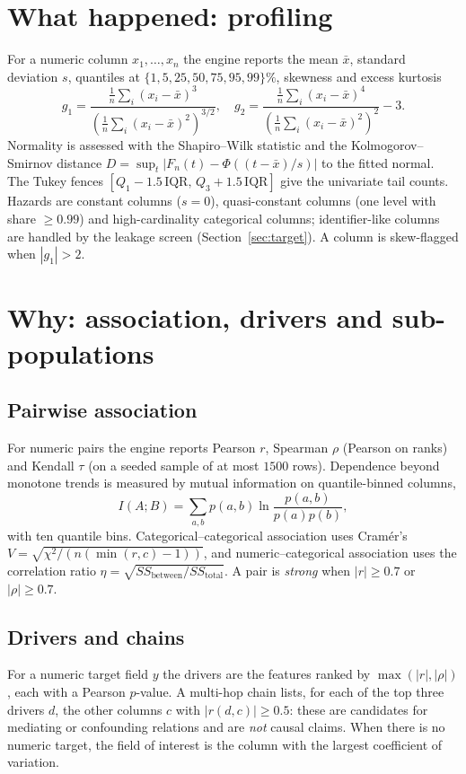 \documentclass[conference]{IEEEtran}
\begin{document}
\section{What happened: profiling}\label{sec:profile}
For a numeric column $x_1,\ldots,x_n$ the engine reports the mean $\bar x$, standard deviation $s$, quantiles at $\{1,5,25,50,75,95,99\}\%$, skewness and excess kurtosis
\begin{equation}g_1=\frac{\tfrac1n\sum_i(x_i-\bar x)^3}{\left(\tfrac1n\sum_i(x_i-\bar x)^2\right)^{3/2}},\quad g_2=\frac{\tfrac1n\sum_i(x_i-\bar x)^4}{\left(\tfrac1n\sum_i(x_i-\bar x)^2\right)^{2}}-3.\end{equation}
Normality is assessed with the Shapiro--Wilk statistic and the Kolmogorov--Smirnov distance $D=\sup_t|F_n(t)-\Phi((t-\bar x)/s)|$ to the fitted normal. The Tukey fences $[Q_1-1.5\,\mathrm{IQR},\,Q_3+1.5\,\mathrm{IQR}]$ give the univariate tail counts. Hazards are constant columns ($s=0$), quasi-constant columns (one level with share $\ge0.99$) and high-cardinality categorical columns; identifier-like columns are handled by the leakage screen (Section~\ref{sec:target}). A column is skew-flagged when $|g_1|>2$.

\section{Why: association, drivers and sub-populations}\label{sec:assoc}
\subsection{Pairwise association}
For numeric pairs the engine reports Pearson $r$, Spearman $\rho$ (Pearson on ranks) and Kendall $\tau$ (on a seeded sample of at most $1500$ rows). Dependence beyond monotone trends is measured by mutual information on quantile-binned columns,
\begin{equation}I(A;B)=\sum_{a,b}p(a,b)\ln\frac{p(a,b)}{p(a)p(b)},\end{equation}
with ten quantile bins. Categorical--categorical association uses Cram\'er's $V=\sqrt{\chi^2/(n(\min(r,c)-1))}$, and numeric--categorical association uses the correlation ratio $\eta=\sqrt{SS_{\text{between}}/SS_{\text{total}}}$. A pair is \emph{strong} when $|r|\ge0.7$ or $|\rho|\ge0.7$.

\subsection{Drivers and chains}
For a numeric target field $y$ the drivers are the features ranked by $\max(|r|,|\rho|)$, each with a Pearson $p$-value. A multi-hop chain lists, for each of the top three drivers $d$, the other columns $c$ with $|r(d,c)|\ge0.5$: these are candidates for mediating or confounding relations and are \emph{not} causal claims. When there is no numeric target, the field of interest is the column with the largest coefficient of variation.
\end{document}
